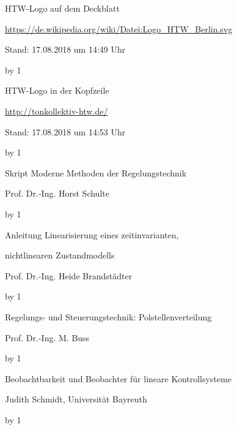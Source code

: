 \documentclass[
	pagesize,
	fontsize=12pt,
	paper=a4,
	oneside,
   reqno
]{scrartcl}
\begin{document}
\begin{thebibliography}{999}
{\setlength{\emergencystretch}{3cm}%

HTW-Logo auf dem Deckblatt\par
\url{https://de.wikipedia.org/wiki/Datei:Logo_HTW_Berlin.svg} \par
 Stand: 17.08.2018 um 14:49 Uhr

\advance\Quellennummer by 1
 
HTW-Logo in der Kopfzeile\par
\url{http://tonkollektiv-htw.de/} \par
 Stand: 17.08.2018 um 14:53 Uhr

\advance\Quellennummer by 1

Skript Moderne Methoden der Regelungstechnik\par
Prof.\xspace Dr.\xspace -Ing.\xspace Horst Schulte

\advance\Quellennummer by 1

Anleitung Linearisierung eines zeitinvarianten,\par
nichtlinearen Zustandmodells\par
Prof.\xspace Dr.\xspace -Ing.\xspace Heide Brandstädter

\advance\Quellennummer by 1

Regelungs- und Steuerungstechnik: Polstellenverteilung\par
Prof.\xspace Dr.\xspace -Ing.\xspace M. Buss

\advance\Quellennummer by 1

Beobachtbarkeit und Beobachter für lineare Kontrollsysteme\par
Judith Schmidt, Universität Bayreuth

\advance\Quellennummer by 1

}
\end{thebibliography}
\end{document}

